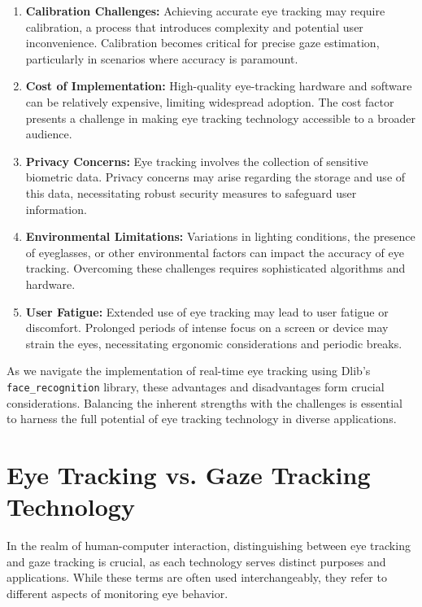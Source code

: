 \documentclass[letterpaper, 10 pt, conference]{ieeeconf}  %
\begin{document}
\begin{enumerate}
    \item \textbf{Calibration Challenges:} Achieving accurate eye tracking may require calibration, a process that introduces complexity and potential user inconvenience. Calibration becomes critical for precise gaze estimation, particularly in scenarios where accuracy is paramount.
    
    \item \textbf{Cost of Implementation:} High-quality eye-tracking hardware and software can be relatively expensive, limiting widespread adoption. The cost factor presents a challenge in making eye tracking technology accessible to a broader audience.
    
    \item \textbf{Privacy Concerns:} Eye tracking involves the collection of sensitive biometric data. Privacy concerns may arise regarding the storage and use of this data, necessitating robust security measures to safeguard user information.
    
    \item \textbf{Environmental Limitations:} Variations in lighting conditions, the presence of eyeglasses, or other environmental factors can impact the accuracy of eye tracking. Overcoming these challenges requires sophisticated algorithms and hardware.
    
    \item \textbf{User Fatigue:} Extended use of eye tracking may lead to user fatigue or discomfort. Prolonged periods of intense focus on a screen or device may strain the eyes, necessitating ergonomic considerations and periodic breaks.
\end{enumerate}

As we navigate the implementation of real-time eye tracking using Dlib's \texttt{face\_recognition} library, these advantages and disadvantages form crucial considerations. Balancing the inherent strengths with the challenges is essential to harness the full potential of eye tracking technology in diverse applications.


\section{Eye Tracking vs. Gaze Tracking Technology}

In the realm of human-computer interaction, distinguishing between eye tracking and gaze tracking is crucial, as each technology serves distinct purposes and applications. While these terms are often used interchangeably, they refer to different aspects of monitoring eye behavior.
\end{document}
